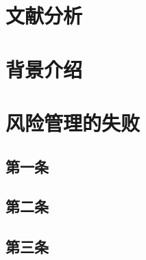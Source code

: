 \section*{文献分析}

\section*{背景介绍} %

\section*{风险管理的失败}

\subsection*{第一条}

\subsection*{第二条}

\subsection*{第三条}
